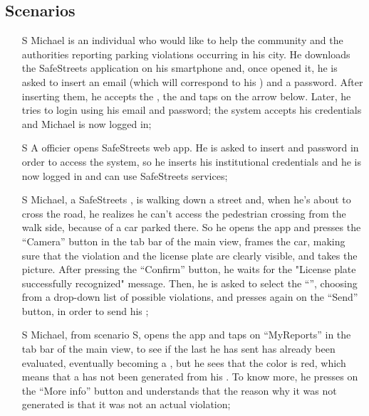 \documentclass[../../../RASD.tex]{subfiles}
\begin{document}
\subsection{Scenarios\label{sect:3.2.1}}

\begin{itemize}
	\item[S\subs{1}]Michael is an individual who would like to help the community and the authorities reporting parking violations occurring in his city. He downloads the SafeStreets application on his smartphone and, once opened it, he is asked to insert an email (which will correspond to his ) and a password. After inserting them, he accepts the , the  and taps on the arrow below. Later, he tries to login using his email and password; the system accepts his credentials and Michael is now logged in;
	
	\item[S\subs{2}]A  officier opens SafeStreets web app. He is asked to insert  and password in order to access the system, so he inserts his  institutional credentials and he is now logged in and can use SafeStreets services;
	
	\item[S\subs{3}]Michael, a SafeStreets , is walking down a street and, when he’s about to cross the road, he realizes he can’t access the pedestrian crossing from the walk side, because of a car parked there. So he opens the app and presses the “Camera” button in the tab bar of the main view, frames the car, making sure that the violation and the license plate are clearly visible, and takes the picture. After pressing the “Confirm” button, he waits for the "License plate successfully recognized" message. Then, he is asked to select the “”, choosing from a drop-down list of possible violations, and presses again on the “Send” button, in order to send his ;
	
	\item[S\subs{4}]Michael, from scenario S, opens the app and taps on “MyReports” in the tab bar of the main view, to see if the last  he has sent has already been evaluated, eventually becoming a , but he sees that the  color is red, which means that a  has not been generated from his . To know more, he presses on the “More info” button and understands that the reason why it was not generated is that it was not an actual violation;
	

\end{itemize}
\end{document}
